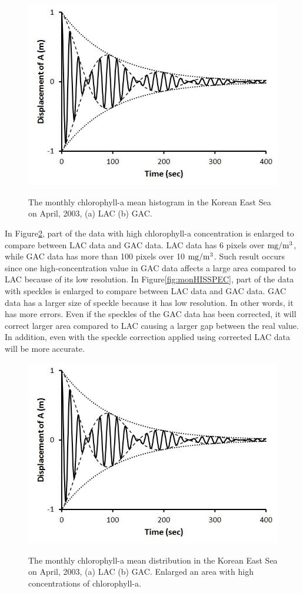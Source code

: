 \begin{figure}[b]
	\centering
	\includegraphics[width=0.8\linewidth]{../images/monHIS}\\
	\caption{The monthly chlorophyll-a mean histogram in the Korean East Sea on April, 2003, (a) LAC (b) GAC.}
	\label{fig:monHIS}
\end{figure}
 
In Figure\ref{fig:monHISHI}, part of the data with high chlorophyll-a concentration is enlarged to compare between LAC data and GAC data. LAC data has 6 pixels over $\rm mg/m^3$, while GAC data has more than 100 pixels over 10 $\rm mg/m^3$. Such result occurs since one high-concentration value in GAC data affects a large area compared to LAC because of its low resolution.
In Figure\ref{fig:monHISSPEC}, part of the data with speckles is enlarged to compare between LAC data and GAC data. GAC data has a larger size of speckle because it has low resolution. In other words, it has more errors. Even if the speckles of the GAC data has been corrected, it will correct larger area compared to LAC causing a larger gap between the real value. In addition, even with the speckle correction applied using corrected LAC data will be more accurate.
    
  \begin{figure}[b]
  	\centering
  	\includegraphics[width=0.8\linewidth]{../images/monHISHI}\\
  	\caption{The monthly chlorophyll-a mean distribution in the Korean East Sea on April, 2003, (a) LAC (b) GAC. Enlarged an area with high concentrations of chlorophyll-a.}
  	\label{fig:monHISHI}
  \end{figure}
  
